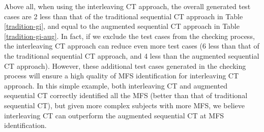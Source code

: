 \documentclass[10pt,journal,compsoc]{IEEEtran}
\begin{document}

Above all, when using the interleaving CT approach,  the overall generated test cases are 2 less than that of the traditional sequential CT approach in Table \ref{tradition-gi}, and equal to the augmented sequential CT approach in Table \ref{tradition-gi-aug}. In fact, if we exclude the test cases from the checking process, the interleaving CT approach can reduce even more test cases (6 less than that of the traditional sequential CT approach, and 4 less than the augmented sequential CT approach). However, these additional test cases generated in the checking process will ensure a high quality of MFS identification for interleaving CT approach. In this simple example, both interleaving CT and augmented sequential CT  correctly identified all the MFS (better than that of traditional sequential CT), but given more complex subjects with more MFS, we believe interleaving CT can outperform the augmented sequential CT at MFS identification.


\end{document}
